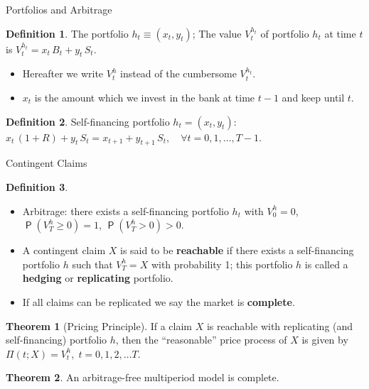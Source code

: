 \documentclass[10pt,handout]{beamer}
\newcommand{\ds}{\displaystyle}
\DeclareMathOperator\prb{\mathsf{P}}
\theoremstyle{definition}
\newtheorem*{dfn}{Definition}
\newtheorem*{thm}{Theorem}
\begin{document}
\begin{frame}{Portfolios and Arbitrage}
\begin{dfn}
  The portfolio $h_t \equiv (x_t, y_t)$; The value $V_t^{h_t}$ of portfolio $h_t$ at time $t$ is $\ds V_t^{h_t} = x_t\,B_t + y_t\,S_t$.
\end{dfn}
\begin{itemize}
  \item Hereafter we write $V_t^h$ instead of the cumbersome $V_t^{h_t}$. 
  \item $x_t$ is the amount which we invest in the bank at time $t-1$ and keep until $t$.
\end{itemize}
\begin{dfn}
  Self-financing portfolio $h_t=(x_t, y_t)$: $\ds x_t\,(1 + R) + y_t\,S_t = x_{t+1} + y_{t+1}\,S_t,\quad\forall t = 0, 1, \ldots, T-1.$
\end{dfn}
\end{frame}

\begin{frame}{Contingent Claims}
\begin{dfn}
  \begin{itemize}
    \item Arbitrage: there exists a self-financing portfolio $h_t$ with $\ds V_0^h = 0$, $\prb(V_T^h\geqslant 0) = 1$, $\ds\prb(V_T^h>0) > 0$.
    \item A contingent claim $X$ is said to be \textbf{reachable} if there exists a self-financing portfolio $h$ such that $V_T^h = X$ with probability 1; this portfolio $h$ is called a \textbf{hedging} or \textbf{replicating} portfolio. 
    \item If all claims can be replicated we say the market is \textbf{complete}. 
  \end{itemize}
\end{dfn}

\begin{thm}[Pricing Principle]
  If a claim $X$ is reachable with replicating (and self-financing) portfolio $h$, then the ``reasonable'' price process of $X$ is given by $\ds \Pi(t; X) = V_t^h, \; t=0, 1, 2, \ldots T$.
\end{thm}

\begin{thm}
  An arbitrage-free multiperiod model is complete.
\end{thm}
\end{frame}
  
\end{document}
